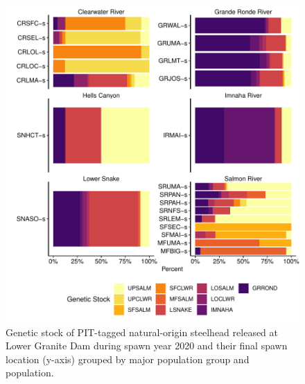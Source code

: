 \documentclass[11pt,a4paper,]{article}
\begin{document}
\begin{figure}
\centering
\includegraphics{Kelt_Summary_files/figure-latex/sum-gsi-sy20-1.pdf}
\caption{\label{fig:sum-gsi-sy20}Genetic stock of PIT-tagged natural-origin steelhead released at Lower Granite Dam during spawn year 2020 and their final spawn location (y-axis) grouped by major population group and population.}
\end{figure}
\end{document}
